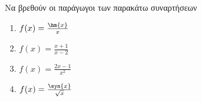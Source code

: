 Να βρεθούν οι παράγωγοι των παρακάτω συναρτήσεων
\begin{enumerate}
\item $ f(x)=\frac{\hm{x}}{x} $
\item $ f(x)=\frac{x+1}{x-2} $
\item $ f(x)=\frac{2x-1}{x^2} $
\item $ f(x)=\frac{\syn{x}}{\sqrt{x}} $
\end{enumerate}

